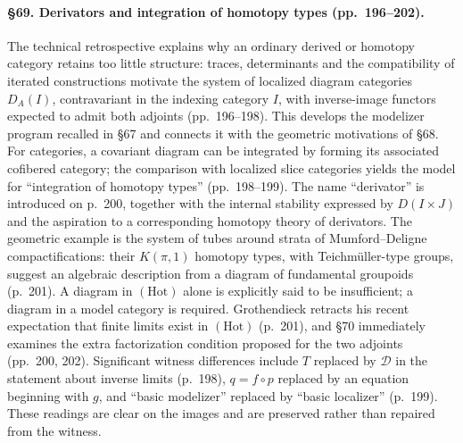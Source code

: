 \paragraph{\S69. Derivators and integration of homotopy types (pp.\ 196--202).}
The technical retrospective explains why an ordinary derived or homotopy category retains too little structure: traces, determinants and the compatibility of iterated constructions motivate the system of localized diagram categories $D_A(I)$, contravariant in the indexing category $I$, with inverse-image functors expected to admit both adjoints (pp.\ 196--198). This develops the modelizer program recalled in \S67 and connects it with the geometric motivations of \S68. For categories, a covariant diagram can be integrated by forming its associated cofibered category; the comparison with localized slice categories yields the model for ``integration of homotopy types'' (pp.\ 198--199). The name ``derivator'' is introduced on p.\ 200, together with the internal stability expressed by $D(I\times J)$ and the aspiration to a corresponding homotopy theory of derivators. The geometric example is the system of tubes around strata of Mumford--Deligne compactifications: their $K(\pi,1)$ homotopy types, with Teichmüller-type groups, suggest an algebraic description from a diagram of fundamental groupoids (p.\ 201). A diagram in $(\mathrm{Hot})$ alone is explicitly said to be insufficient; a diagram in a model category is required. Grothendieck retracts his recent expectation that finite limits exist in $(\mathrm{Hot})$ (p.\ 201), and \S70 immediately examines the extra factorization condition proposed for the two adjoints (pp.\ 200, 202). Significant witness differences include $T$ replaced by $\mathscr D$ in the statement about inverse limits (p.\ 198), $q=f\circ p$ replaced by an equation beginning with $g$, and ``basic modelizer'' replaced by ``basic localizer'' (p.\ 199). These readings are clear on the images and are preserved rather than repaired from the witness.

